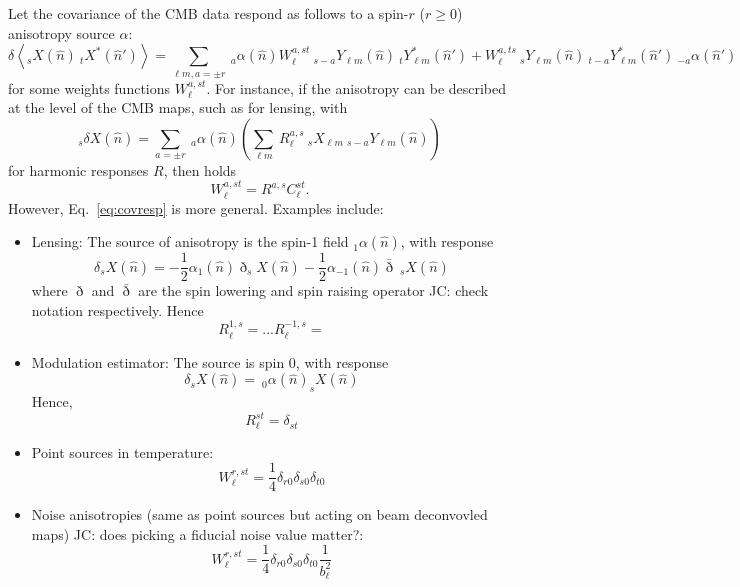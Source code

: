 \documentclass{article}
\newcommand{\Ylm}[1]{\:_{#1}Y_{\ell m}}
\newcommand{\av}[1]{\left\langle #1 \right\rangle}
\newcommand{\JC}[1]{\color{red}JC: #1\color{black}}
\newcommand{\hn}[0]{\hat n}
\begin{document}
Let the covariance of the CMB data respond as follows to a spin-$r$  ($r \ge 0$) anisotropy source $\alpha$:
\begin{equation}\label{eq:covresp}
	\delta  \av{_sX(\hn) \:_tX^*(\hn')} =   \sum_{\ell m, a = \pm r}\:_{a}\alpha(\hn) W_\ell^{a, st} \:_{s - a}Y_{\ell m}(\hn)  \:_{t}Y^*_{\ell m}(\hn')  +   W_\ell^{a, ts} \:_{s}Y_{\ell m}(\hn)  \:_{t-a}Y^*_{\ell m}(\hn')\:_{-a}\alpha(\hn')
\end{equation}
for some weights functions $W_\ell^{a, st}$. For instance, if the anisotropy can be described at the level of the CMB maps, such as for lensing, with
\begin{equation}
	_{s}\delta X(\hn) = \sum_{a = \pm r}\:_{a}\alpha(\hn) \left( \sum_{\ell m}\: R_\ell^{a, s} \:_sX_{\ell m} \Ylm {s- a}(\hn)\right)
\end{equation}
for harmonic responses $R$, then holds
\begin{equation}
	W_\ell^{a, st} = R^{a, s} C_\ell^{st}.
\end{equation}
However, Eq.~\eqref{eq:covresp} is more general.
Examples include:
\begin{itemize}
	\item Lensing: The source of anisotropy is the spin-1 field $_1\alpha(\hn)$, with response
	\begin{equation}
		\delta _sX(\hn) =  -\frac 12 \alpha_1(\hn) \eth _{s}X(\hn) - \frac 12 \alpha_{-1}(\hn) \bar \eth \:_sX(\hn) 
	\end{equation}
	where $\eth$ and $\bar \eth$ are the spin lowering and spin raising operator \JC{check notation } respectively. Hence
	\begin{equation}
		R_\ell^{1, s} =  ... R_\ell^{-1, s} =
	\end{equation}
	\item Modulation estimator: The source is spin 0, with response
	\begin{equation}
	\delta _sX(\hn) = \:_0\alpha(\hn) _{s}X(\hn)	
	\end{equation}
	Hence,
	\begin{equation}
		R_\ell^{st} = \delta_{st}
	\end{equation}
	\item Point sources in temperature:
	\begin{equation}
	W^{r, st}_\ell = \frac 14\delta_{r0}\delta_{s0}\delta_{t0} 
	\end{equation}
	\item Noise anisotropies (same as point sources but acting on beam deconvovled maps) \JC{does picking a fiducial noise value matter?}:
	\begin{equation}
	W^{r, st}_\ell = \frac 14\delta_{r0}\delta_{s0}\delta_{t0}  \frac{1}{b_\ell^2}
	\end{equation}
\end{itemize}
\end{document}
